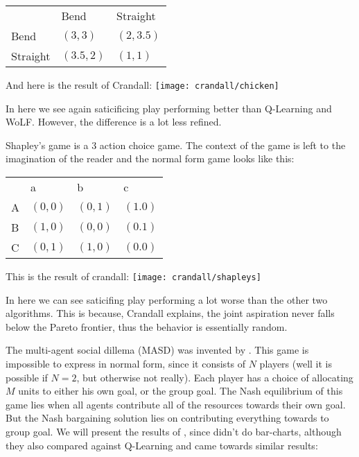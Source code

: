 \begin{tabular}{lll}
              & Bend & Straight \\
    Bend & $(3,3)$     & $(2,3.5)$  \\
    Straight & $(3.5,2)$     & $(1,1)$  \\
\end{tabular}

And here is the result of Crandall:
\texttt{[image: crandall/chicken]}

In here we see again saticificing play performing better than Q-Learning and
WoLF. However, the difference is a lot less refined.

Shapley's game is a 3 action choice game. The context of the game is left to
the imagination of the reader and the normal form game looks like this:

\begin{tabular}{llll}
              & a & b & c \\
    A & $(0,0)$ & $(0,1)$     & $(1.0)$  \\
    B & $(1,0)$ & $(0,0)$     & $(0.1)$  \\
    C & $(0,1)$ & $(1,0)$     & $(0.0)$  \\
\end{tabular}

This is the result of crandall:
\texttt{[image: crandall/shapleys]}

In here we can see saticifing play performing a lot worse than the other two
algorithms. This is because, Crandall explains, the joint aspiration never
falls below the Pareto frontier, thus the behavior is essentially random.

\noindent
{}

The multi-agent social dillema (MASD) was invented by \citep{stimpson:2003}. This game
is impossible to express in normal form, since it consists of $N$ players (well
it is possible if $N=2$, but otherwise not really).
Each player has a choice of allocating $M$ units to either his own goal, 
or the group goal. The Nash equilibrium of this game lies when all agents
contribute all of the resources towards their own goal. But the Nash bargaining
solution lies on contributing everything towards to group goal. We will present
the results of \citep{crandall}, since \citep{stimpson:2003} didn't do bar-charts,
although they also compared against Q-Learning and came towards similar results:

